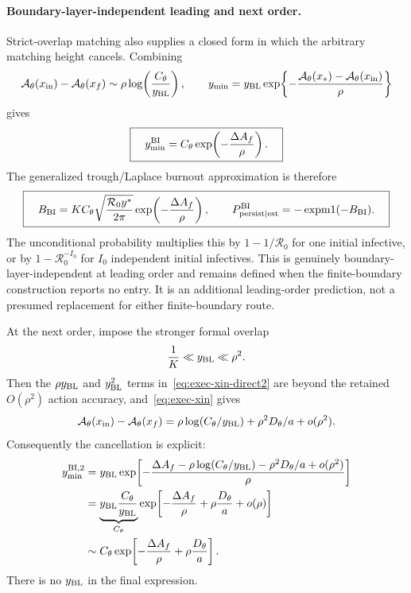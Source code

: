 \documentclass[11pt,a4paper]{article}
\newcommand{\Rzero}{\mathcal R_0}
\newcommand{\Afun}{\mathcal A_\theta}
\newcommand{\BL}{y_{\rm BL}}
\newcommand{\xf}{x_f}
\newcommand{\xs}{x_*}
\begin{document}
\paragraph{Boundary-layer-independent leading and next order.}
Strict-overlap matching also supplies a closed form in which the arbitrary
matching height cancels.  Combining
\begin{equation}
 \Afun(x_{\rm in})-\Afun(\xf)\sim
 \rho\log\!\left(\frac{C_\theta}{\BL}\right),
 \qquad
 y_{\min}=\BL\exp\!\left\{-\frac{\Afun(\xs)-\Afun(x_{\rm in})}{\rho}\right\}
\end{equation}
gives
\begin{equation}
 \boxed{\quad y_{\min}^{\rm BI}=C_\theta
 \exp\!\left(-\frac{\Delta A_f}{\rho}\right).\quad}
 \label{eq:exec-ymin-BI}
\end{equation}
The generalized trough/Laplace burnout approximation is therefore
\begin{equation}
 \boxed{\quad B_{\rm BI}=K C_\theta
 \sqrt{\frac{\Rzero y^*}{2\pi}}
 \exp\!\left(-\frac{\Delta A_f}{\rho}\right),\qquad
 P_{\rm persist\mid est}^{\rm BI}=-\operatorname{expm1}(-B_{\rm BI}).\quad}
 \label{eq:exec-BI}
\end{equation}
The unconditional probability multiplies this by $1-1/\Rzero$ for one initial
infective, or by $1-\Rzero^{-I_0}$ for $I_0$ independent initial infectives.
This is genuinely boundary-layer-independent at leading order and remains
defined when the finite-boundary construction reports no entry.  It is an
additional leading-order prediction, not a presumed replacement for either
finite-boundary route.

At the next order, impose the stronger formal overlap
\begin{equation}
 \frac1K\ll\BL\ll\rho^2.
 \label{eq:exec-BI-overlap2}
\end{equation}
Then the $\rho\BL$ and $\BL^2$ terms in~\eqref{eq:exec-xin-direct2} are beyond
the retained $O(\rho^2)$ action accuracy, and~\eqref{eq:exec-xin} gives
\[
 \Afun(x_{\rm in})-\Afun(\xf)
 =\rho\log(C_\theta/\BL)+\rho^2D_\theta/a+o(\rho^2).
\]
Consequently the cancellation is explicit:
\begin{align}
 y_{\min}^{\mathrm{BI},2}
 &=\BL\exp\!\left[-\frac{\Delta A_f-
 \rho\log(C_\theta/\BL)-\rho^2D_\theta/a+o(\rho^2)}{\rho}\right]\nonumber\\
 &=\underbrace{\BL\frac{C_\theta}{\BL}}_{C_\theta}
 \exp\!\left[-\frac{\Delta A_f}{\rho}+\rho\frac{D_\theta}{a}+o(\rho)\right]\nonumber\\
 &\sim C_\theta\exp\!\left[-\frac{\Delta A_f}{\rho}
 +\rho\frac{D_\theta}{a}\right].
 \label{eq:exec-ymin-BI2}
\end{align}
There is no $\BL$ in the final expression.
\end{document}
